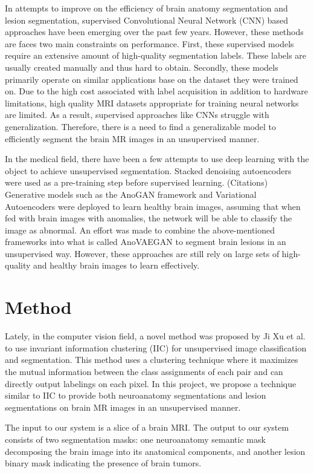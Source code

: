 \documentclass[12pt]{article}
\begin{document}
In attempts to improve on the efficiency of brain anatomy segmentation and lesion segmentation, supervised Convolutional Neural Network (CNN) based approaches have been emerging over the past few years. However, these methods are faces two main constraints on performance. First, these supervised models require an extensive amount of high-quality segmentation labels. These labels are usually created manually and thus hard to obtain. Secondly, these models primarily operate on similar applications base on the dataset they were trained on. Due to the high cost associated with label acquisition in addition to hardware limitations, high quality MRI datasets appropriate for training neural networks are limited. As a result, supervised approaches like CNNs struggle with generalization. Therefore, there is a need to find a generalizable model to efficiently segment the brain MR images in an unsupervised manner.

In the medical field, there have been a few attempts to use deep learning with the object to achieve unsupervised segmentation. Stacked denoising autoencoders were used as a pre-training step before supervised learning. (Citations) Generative models such as the AnoGAN framework and Variational Autoencoders were deployed to learn healthy brain images, assuming that when fed with brain images with anomalies, the network will be able to classify the image as abnormal. An effort was made to combine the above-mentioned frameworks into what is called AnoVAEGAN to segment brain lesions in an unsupervised way. However, these approaches are still rely on large sets of high-quality and healthy brain images to learn effectively.

\section{Method}

Lately, in the computer vision field, a novel method was proposed by Ji Xu et al. to use invariant information clustering (IIC) for unsupervised image classification and segmentation.  This method uses a clustering technique where it maximizes the mutual information between the class assignments of each pair and can directly output labelings on each pixel. In this project, we propose a technique similar to IIC to provide both neuroanatomy segmentations and lesion segmentations on brain MR images in an unsupervised manner.

The input to our system is a slice of a brain MRI. The output to our system consists of two segmentation masks: one neuroanatomy semantic mask decomposing the brain image into its anatomical components, and another lesion binary mask indicating the presence of brain tumors.
\end{document}
